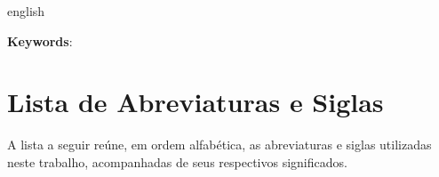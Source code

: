 \documentclass[
    12pt,                %
    openright,           %
    oneside,             %
    a4paper,             %
    english,             %
    brazil               %
]{abntex2}
\begin{document}
\begin{resumo}[Abstract]
 \begin{otherlanguage*}{english}

   \vspace{\onelineskip}

   \noindent
   \textbf{Keywords}:
 \end{otherlanguage*}
\end{resumo}

\listoffigures*
\cleardoublepage

\listoftables*
\cleardoublepage

\chapter*{Lista de Abreviaturas e Siglas}

\noindent A lista a seguir reúne, em ordem alfabética, as abreviaturas e siglas utilizadas neste trabalho, acompanhadas de seus respectivos significados.
\end{document}
